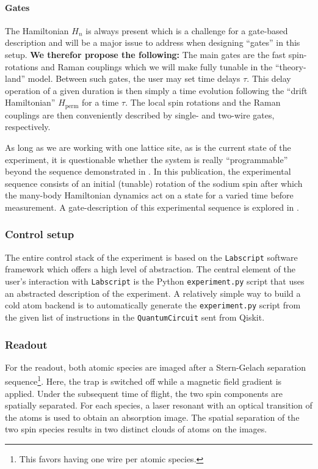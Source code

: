 \documentclass[a4paper, 10pt]{article}
\begin{document}
    \paragraph{Gates}
    \noindent The Hamiltonian $H_n$ is always present which is a challenge for a gate-based description and will be a major issue to address when designing ``gates'' in this setup.
    \textbf{We therefor propose the following:}
    The main gates are the fast spin-rotations and Raman couplings which we will make fully tunable in the ``theory-land'' model. Between such gates, the user may set time delays $\tau$.
    This delay operation of a given duration is then simply a time evolution following the ``drift Hamiltonian'' $H_{\text{perm}}$ for a time $\tau$. 
    The local spin rotations and the Raman couplings are then conveniently described by single- and two-wire gates, respectively.
        
    As long as we are working with one lattice site, as is the current state of the experiment, it is questionable whether the system is really ``programmable'' beyond the sequence  demonstrated in \cite{mil2020scalable}.
    In this publication, the experimental sequence consists of an initial (tunable) rotation of the sodium spin after which the many-body Hamiltonian dynamics act on a state for a varied time before measurement.
    A gate-description of this experimental sequence is explored in \cite{Jendrzejewski_2020}.
    
    \subsubsection{Control setup}
        
    The entire control stack of the experiment is based on the \texttt{Labscript} software framework which offers a high level of abstraction. The central element of the user's interaction with \texttt{Labscript} is the Python \texttt{experiment.py} script that uses an abstracted description of the experiment.
    A relatively simple way to build a cold atom backend is to automatically generate the \texttt{experiment.py} script from the given list of instructions in the \texttt{QuantumCircuit} sent from Qiskit. 
        
        

    \subsubsection{Readout}
        
    For the readout, both atomic species are imaged after a Stern-Gelach separation sequence\footnote{This favors having one wire per atomic species.}.
    Here, the trap is switched off while a magnetic field gradient is applied.
    Under the subsequent time of flight, the two spin components are spatially separated.
    For each species, a laser resonant with an optical transition of the atoms is used to obtain an absorption image.
    The spatial separation of the two spin species results in two distinct clouds of atoms on the images.
    
\end{document}
